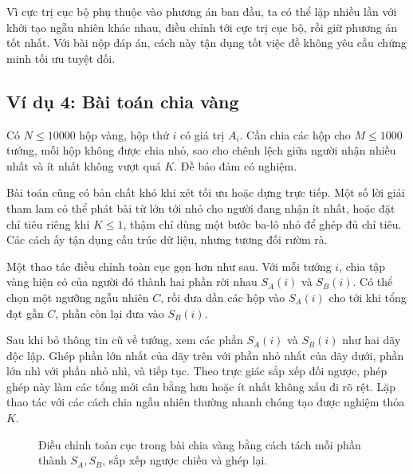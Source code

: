 \documentclass[11pt]{article}
\begin{document}
Vì cực trị cục bộ phụ thuộc vào phương án ban đầu, ta có thể lặp nhiều lần với
khởi tạo ngẫu nhiên khác nhau, điều chỉnh tới cực trị cục bộ, rồi giữ phương án
tốt nhất. Với bài nộp đáp án, cách này tận dụng tốt việc đề không yêu cầu chứng
minh tối ưu tuyệt đối.

\subsection{Ví dụ 4: Bài toán chia vàng}

Có \(N\le 10000\) hộp vàng, hộp thứ \(i\) có giá trị \(A_i\). Cần chia các hộp
cho \(M\le 1000\) tướng, mỗi hộp không được chia nhỏ, sao cho chênh lệch giữa
người nhận nhiều nhất và ít nhất không vượt quá \(K\). Đề bảo đảm có nghiệm.

Bài toán cũng có bản chất khó khi xét tối ưu hoặc dựng trực tiếp. Một số lời
giải tham lam có thể phát bài từ lớn tới nhỏ cho người đang nhận ít nhất, hoặc
đặt chỉ tiêu riêng khi \(K\le1\), thậm chí dùng một bước ba-lô nhỏ để ghép đủ
chỉ tiêu. Các cách ấy tận dụng cấu trúc dữ liệu, nhưng tương đối rườm rà.

Một thao tác điều chỉnh toàn cục gọn hơn như sau. Với mỗi tướng \(i\), chia
tập vàng hiện có của người đó thành hai phần rời nhau \(S_A(i)\) và \(S_B(i)\).
Có thể chọn một ngưỡng ngẫu nhiên \(C\), rồi đưa dần các hộp vào \(S_A(i)\) cho
tới khi tổng đạt gần \(C\), phần còn lại đưa vào \(S_B(i)\).

Sau khi bỏ thông tin cũ về tướng, xem các phần \(S_A(i)\) và \(S_B(i)\) như
hai dãy độc lập. Ghép phần lớn nhất của dãy trên với phần nhỏ nhất của dãy
dưới, phần lớn nhì với phần nhỏ nhì, và tiếp tục. Theo trực giác sắp xếp đối
ngược, phép ghép này làm các tổng mới cân bằng hơn hoặc ít nhất không xấu đi
rõ rệt. Lặp thao tác với các cách chia ngẫu nhiên thường nhanh chóng tạo được
nghiệm thỏa \(K\).

\begin{figure}[ht]
\centering
{}
\caption{Điều chỉnh toàn cục trong bài chia vàng bằng cách tách mỗi phần thành
\(S_A,S_B\), sắp xếp ngược chiều và ghép lại.}
\end{figure}
\end{document}
